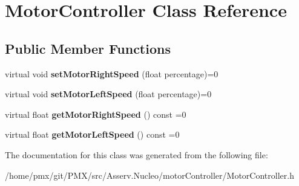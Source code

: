 \hypertarget{classMotorController}{}\section{Motor\+Controller Class Reference}
\label{classMotorController}
\subsection*{Public Member Functions}
\begin{DoxyCompactItemize}
\item 
\mbox{\label{classMotorController_af00afcdb1f7a4a304598010cb4622065}} 
virtual void {\bfseries set\+Motor\+Right\+Speed} (float percentage)=0
\item 
\mbox{\label{classMotorController_aafc2e329dad4cb415a3dd31b7fc677fb}} 
virtual void {\bfseries set\+Motor\+Left\+Speed} (float percentage)=0
\item 
\mbox{\label{classMotorController_a8649fd71aa37fa0cb3aaf6119a06eb63}} 
virtual float {\bfseries get\+Motor\+Right\+Speed} () const =0
\item 
\mbox{\label{classMotorController_a805920dc09446766da1b248b82587f2d}} 
virtual float {\bfseries get\+Motor\+Left\+Speed} () const =0
\end{DoxyCompactItemize}


The documentation for this class was generated from the following file\+:\begin{DoxyCompactItemize}
\item 
/home/pmx/git/\+P\+M\+X/src/\+Asserv.\+Nucleo/motor\+Controller/Motor\+Controller.\+h\end{DoxyCompactItemize}
